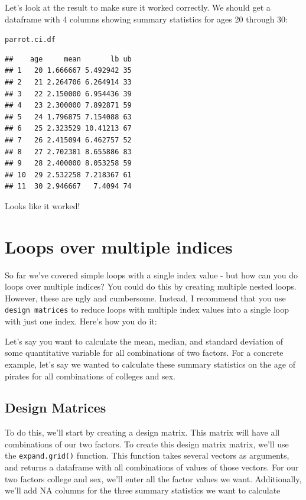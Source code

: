 \documentclass{tufte-book}\usepackage[]{graphicx}\usepackage[]{color}
\makeatletter
\newcommand{\hlstd}[1]{\textcolor[rgb]{0.345,0.345,0.345}{#1}}%
\newenvironment{kframe}{%
 \def\at@end@of@kframe{}%
 \ifinner\ifhmode%
  \def\at@end@of@kframe{\end{minipage}}%
  \begin{minipage}{\columnwidth}%
 \fi\fi%
 \def\FrameCommand##1{\hskip\@totalleftmargin \hskip-\fboxsep
 \colorbox{shadecolor}{##1}\hskip-\fboxsep
     \hskip-\linewidth \hskip-\@totalleftmargin \hskip\columnwidth}%
 \MakeFramed {\advance\hsize-\width
   \@totalleftmargin\z@ \linewidth\hsize
   \@setminipage}}%
 {\par\unskip\endMakeFramed%
 \at@end@of@kframe}
\newenvironment{knitrout}{}{} %
\makeatother
\begin{document}
Let's look at the result to make sure it worked correctly. We should get a dataframe with 4 columns showing summary statistics for ages 20 through 30:

\begin{knitrout}
\color{fgcolor}\begin{kframe}
\begin{alltt}
\hlstd{parrot.ci.df}
\end{alltt}
\begin{verbatim}
##    age     mean       lb ub
## 1   20 1.666667 5.492942 35
## 2   21 2.264706 6.264914 33
## 3   22 2.150000 6.954436 39
## 4   23 2.300000 7.892871 59
## 5   24 1.796875 7.154088 63
## 6   25 2.323529 10.41213 67
## 7   26 2.415094 6.462757 52
## 8   27 2.702381 8.655886 83
## 9   28 2.400000 8.053258 59
## 10  29 2.532258 7.218367 61
## 11  30 2.946667   7.4094 74
\end{verbatim}
\end{kframe}
\end{knitrout}

Looks like it worked!


\section{Loops over multiple indices}

So far we've covered simple loops with a single index value - but how can you do loops over multiple indices? You could do this by creating multiple nested loops. However, these are ugly and cumbersome. Instead, I recommend that you use \texttt{design matrices} to reduce loops with multiple index values into a single loop with just one index. Here's how you do it:

Let's say you want to calculate the mean, median, and standard deviation of some quantitative variable for all combinations of two factors. For a concrete example, let's say we wanted to calculate these summary statistics on the age of pirates for all combinations of colleges and sex.

\subsection{Design Matrices}

To do this, we'll start by creating a design matrix. This matrix will have all combinations of our two factors. To create this design matrix matrix, we'll use the \texttt{expand.grid()} function. This function takes several vectors as arguments, and returns a dataframe with all combinations of values of those vectors. For our two factors college and sex, we'll enter all the factor values we want. Additionally, we'll add NA columns for the three summary statistics we want to calculate
\end{document}

